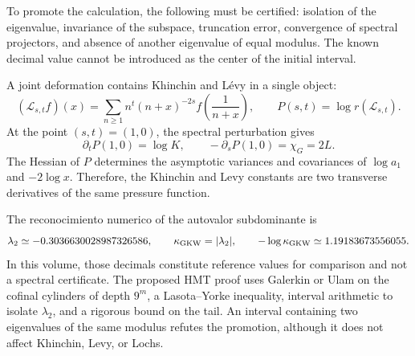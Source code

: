To promote the calculation, the following must be certified: isolation of the eigenvalue, invariance of the subspace, truncation error, convergence of spectral projectors, and absence of another eigenvalue of equal modulus. The known decimal value cannot be introduced as the center of the initial interval.

A joint deformation contains Khinchin and Lévy in a single object:
\begin{equation}
(\mathcal L_{s,t}f)(x)
=\sum_{n\ge1}n^t(n+x)^{-2s}
 f\!\left(\frac1{n+x}\right),
\qquad
P(s,t)=\log r(\mathcal L_{s,t}).
\label{eq:gauss-pressure-operator}
\end{equation}
At the point \((s,t)=(1,0)\), the spectral perturbation gives
\begin{equation}
\partial_tP(1,0)=\log K,
\qquad
-\partial_sP(1,0)=\chi_G=2L.
\label{eq:pressure-derivatives}
\end{equation}
The Hessian of \(P\) determines the asymptotic variances and covariances of
\(\log a_1\) and \(-2\log x\). Therefore, the Khinchin and
Levy constants are two transverse derivatives of the same pressure function.

The reconocimiento numerico of the autovalor subdominante is
\[
\lambda_2\simeq-0.3036630028987326586,\qquad
\kappa_{\rm GKW}=|\lambda_2|,\qquad
-\log\kappa_{\rm GKW}\simeq1.19183673556055.
\]
In this volume, those decimals constitute reference values for
comparison and not a spectral certificate.
The proposed HMT proof uses Galerkin or Ulam on the cofinal cylinders of
depth \(9^m\), a Lasota--Yorke inequality, interval arithmetic to
isolate \(\lambda_2\), and a rigorous bound on the tail. An
interval containing two eigenvalues of the same modulus refutes the
promotion, although it does not affect Khinchin, Levy, or Lochs.

